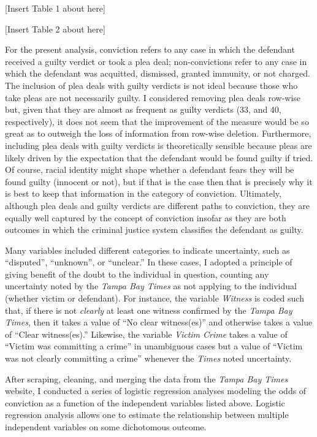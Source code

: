 \documentclass[12pt,article]{article}
\begin{document}
\begin{center}[Insert Table 1 about here]\end{center}

\begin{center}[Insert Table 2 about here]\end{center}

For the present analysis, conviction refers to any case in which the
defendant received a guilty verdict or took a plea deal; non-convictions
refer to any case in which the defendant was acquitted, dismissed,
granted immunity, or not charged. The inclusion of plea deals with guilty verdicts is not ideal because those who take pleas are not necessarily guilty. I considered removing plea deals row-wise but, given that they are almost as frequent as guilty verdicts (33, and 40, respectively), it does not seem that the improvement of the measure would be so great as to outweigh the loss of information from row-wise deletion. Furthermore, including plea deals with guilty verdicts is theoretically sensible because pleas are likely driven by the expectation that the defendant would be found guilty if tried. Of course, racial identity might shape whether a defendant fears they will be found guilty (innocent or not), but if that is the case then that is precisely why it is best to keep that information in the category of conviction. Ultimately, although plea deals and guilty verdicts are different paths to conviction, they are equally well captured by the concept of conviction insofar as they are both outcomes in which the criminal justice system classifies the defendant as guilty.

Many variables included different categories to indicate uncertainty,
such as ``disputed'', ``unknown'', or ``unclear.'' In these cases, I
adopted a principle of giving benefit of the doubt to the individual in
question, counting any uncertainty noted by the \emph{Tampa Bay Times}
as not applying to the individual (whether victim or defendant). For
instance, the variable \emph{Witness} is coded such that, if there is
not \emph{clearly} at least one witness confirmed by the \emph{Tampa Bay
Times}, then it takes a value of ``No clear witness(es)'' and otherwise
takes a value of ``Clear witness(es).'' Likewise, the variable
\emph{Victim Crime} takes a value of ``Victim was committing a crime''
in unambiguous cases but a value of ``Victim was not clearly committing
a crime'' whenever the \emph{Times} noted uncertainty.

After scraping, cleaning, and merging the data from the \emph{Tampa Bay
Times} website, I conducted a series of logistic regression analyses
modeling the odds of conviction as a function of the independent
variables listed above. Logistic regression analysis allows one to
estimate the relationship between multiple independent variables on some
dichotomous outcome.
\end{document}
